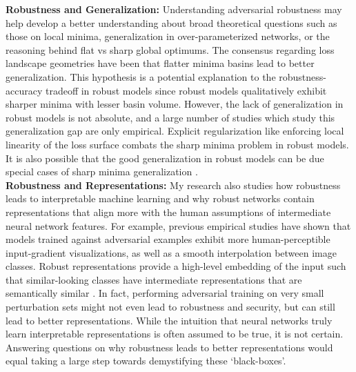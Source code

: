 \documentclass[11pt]{article}
\begin{document}
\textbf{Robustness and Generalization:} Understanding adversarial robustness may help develop a better understanding about broad theoretical questions such as those on local minima, generalization in over-parameterized networks, or the reasoning behind flat vs sharp global optimums. The consensus regarding loss landscape geometries have been that flatter minima basins lead to better generalization. This hypothesis is a potential explanation to the robustness-accuracy tradeoff in robust models \cite{tsipras2018robustness} since robust models qualitatively exhibit sharper minima with lesser basin volume. 
However, the lack of generalization in robust models is not absolute, and a large number of studies which study this generalization gap are only empirical. Explicit regularization like enforcing local linearity of the loss surface combats the sharp minima problem in robust models. It is also possible that the good generalization in robust models can be due special cases of sharp minima generalization \cite{10.5555/3305381.3305487}.\\

\textbf{Robustness and Representations:} My research also studies how robustness leads to interpretable machine learning and why robust networks contain representations that align more with the human assumptions of intermediate neural network features. For example, previous empirical studies have shown that models trained against adversarial examples exhibit more human-perceptible input-gradient visualizations, as well as a smooth interpolation between image classes. Robust representations provide a high-level embedding of the input such that similar-looking classes have intermediate representations that are semantically similar \cite{engstrom2019adversarial}. In fact, performing adversarial training on very small perturbation sets might not even lead to robustness and security, but can still lead to better representations. While the intuition that neural networks truly learn interpretable representations is often assumed to be true, it is not certain. Answering questions on why robustness leads to better representations would equal taking a large step towards demystifying these `black-boxes'. \\

\end{document}
